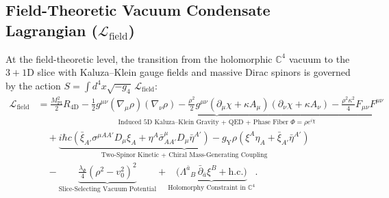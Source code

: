 \documentclass[11pt,a4paper]{article}
\begin{document}
\subsection{Field-Theoretic Vacuum Condensate Lagrangian (\texorpdfstring{$\mathcal{L}_{\text{field}}$}{L\_field})}
At the field-theoretic level, the transition from the holomorphic $\mathbb{C}^4$ vacuum to the $3+1\text{D}$ slice with Kaluza--Klein gauge fields and massive Dirac spinors is governed by the action $S = \int d^4x \sqrt{-g_4}\, \mathcal{L}_{\text{field}}$:
\begin{equation}
\begin{aligned}
\mathcal{L}_{\text{field}} &= \underbrace{\frac{M_{\text{Pl}}^2}{2} R_{4\text{D}} - \frac{1}{2} g^{\mu\nu} (\nabla_\mu \rho)(\nabla_\nu \rho) - \frac{\rho^2}{2} g^{\mu\nu} (\partial_\mu \chi + \kappa A_\mu)(\partial_\nu \chi + \kappa A_\nu) - \frac{\rho^2 \kappa^2}{4} F_{\mu\nu}F^{\mu\nu}}_{\text{Induced 5D Kaluza--Klein Gravity + QED + Phase Fiber }\Phi = \rho e^{i\chi}} \\
&\quad + \underbrace{i\hbar c \left( \bar{\xi}_{A'} \sigma^{\mu AA'} D_\mu \xi_A + \eta^A \bar{\sigma}^\mu_{AA'} D_\mu \bar{\eta}^{A'} \right) - g_{\text{Y}} \rho \left( \xi^A \eta_A + \bar{\xi}_{A'} \bar{\eta}^{A'} \right)}_{\text{Two-Spinor Kinetic + Chiral Mass-Generating Coupling}} \\
&\quad - \underbrace{\frac{\lambda_\Phi}{4}\left( \rho^2 - v_0^2 \right)^2}_{\text{Slice-Selecting Vacuum Potential}} + \underbrace{\Big( \Lambda^{\bar{a}}{}_B\, \bar{\partial}_{\bar{a}} \xi^B + \text{h.c.} \Big)}_{\text{Holomorphy Constraint in }\mathbb{C}^4}.
\end{aligned}
\end{equation}
\end{document}
